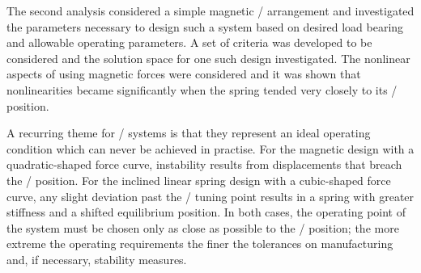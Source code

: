 \documentclass[11pt,a4paper]{memoir}
\begin{document}
The second analysis considered a simple magnetic \qzs/ arrangement and investigated the parameters necessary to design such a system based on desired load bearing and allowable operating parameters.
A set of criteria was developed to be considered and the solution space for one such design investigated.
The nonlinear aspects of using magnetic forces were considered and it was shown that nonlinearities became significantly when the spring tended very closely to its \qzs/ position.

A recurring theme for \qzs/ systems is that they represent an ideal operating condition which can never be achieved in practise.
For the magnetic design with a quadratic-shaped force curve, instability results from displacements that breach the \qzs/ position.
For the inclined linear spring design with a cubic-shaped force curve, any slight deviation past the \qzs/ tuning point results in a spring with greater stiffness and a shifted equilibrium position.
In both cases, the operating point of the system must be chosen only as close as possible to the \qzs/ position; the more extreme the operating requirements the finer the tolerances on manufacturing and, if necessary, stability measures.
\end{document}

